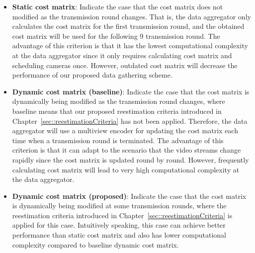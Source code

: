 \begin{itemize}
\item \textbf{Static cost matrix}: Indicate the case that the cost matrix does not modified as the transmission round changes.
That is, the data aggregator only calculates the cost matrix for the first transmission round, and the obtained cost matrix will be used for the following $9$ transmission round.
The advantage of this criterion is that it has the lowest computational complexity at the data aggregator since it only requires calculating cost matrix and scheduling cameras once.
However, outdated cost matrix will decrease the performance of our proposed data gathering scheme.
\item \textbf{Dynamic cost matrix (baseline)}: Indicate the case that the cost matrix is dynamically being modified as the transmission round changes, where baseline means that our proposed reestimation criteria introduced in Chapter~\ref{sec::reestimationCriteria} has not been applied.
Therefore, the data aggregator will use a multiview encoder for updating the cost matrix each time when a transmission round is terminated.
The advantage of this criterion is that it can adapt to the scenario that the video streams change rapidly since the cost matrix is updated round by round.
However, frequently calculating cost matrix will lead to very high computational complexity at the data aggregator.
\item \textbf{Dynamic cost matrix (proposed)}:
Indicate the case that the cost matrix is dynamically being modified at some transmission rounds, where the reestimation criteria introduced in Chapter~\ref{sec::reestimationCriteria} is applied for this case.
Intuitively speaking, this case can achieve better performance than static cost matrix and also has lower computational complexity compared to baseline dynamic cost matrix.
\end{itemize}

